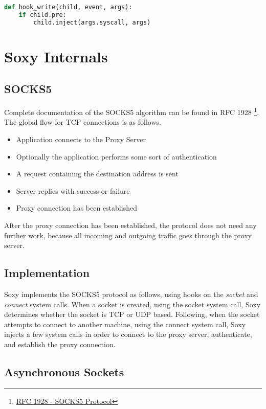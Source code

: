 \documentclass[a4paper, 10pt]{report}
\begin{document}
\begin{lstlisting}[language=Python]
def hook_write(child, event, args):
    if child.pre:
        child.inject(args.syscall, args)
\end{lstlisting}

\section{Soxy Internals}

\subsection{SOCKS5}

Complete documentation of the SOCKS5 algorithm can be found in
RFC 1928 \footnote{\href{http://www.ietf.org/rfc/rfc1928.txt}
{RFC 1928 - SOCKS5 Protocol}}. The global flow for TCP connections
is as follows.

\begin{itemize}
\item Application connects to the Proxy Server
\item Optionally the application performs some sort of authentication
\item A request containing the destination address is sent
\item Server replies with success or failure
\item Proxy connection has been established
\end{itemize}

After the proxy connection has been established, the protocol does not need
any further work, because all incoming and outgoing traffic goes through the
proxy server.

\subsection{Implementation}

Soxy implements the SOCKS5 protocol as follows, using hooks on the
\textit{socket} and \textit{connect} system calls. When a
socket is created, using the socket system call, Soxy determines whether the
socket is TCP or UDP based. Following, when the socket attempts to connect to
another machine, using the connect system call, Soxy injects a few system
calls in order to connect to the proxy server, authenticate, and establish the
proxy connection.

\subsection{Asynchronous Sockets}
\end{document}
